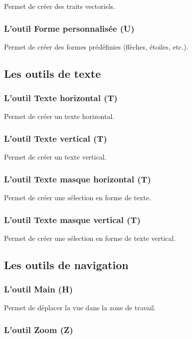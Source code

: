 Permet de créer des traits vectoriels.

\subsubsection{L'outil Forme personnalisée (U)}

Permet de créer des formes prédéfinies (flèches, étoiles, etc.).

\subsection{Les outils de texte}

\subsubsection{L'outil Texte horizontal (T)}

Permet de créer un texte horizontal.

\subsubsection{L'outil Texte vertical (T)}

Permet de créer un texte vertical.

\subsubsection{L'outil Texte masque horizontal (T)}

Permet de créer une sélection en forme de texte.

\subsubsection{L'outil Texte masque vertical (T)}

Permet de créer une sélection en forme de texte vertical.

\subsection{Les outils de navigation}

\subsubsection{L'outil Main (H)}

Permet de déplacer la vue dans la zone de travail.

\subsubsection{L'outil Zoom (Z)}

